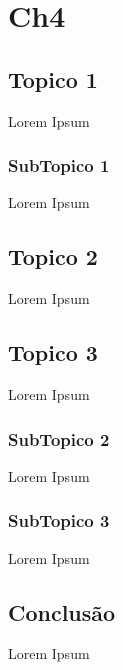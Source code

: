 \chapter{Ch4}
\label{chap:imp-test}

\section{Topico 1}
\label{chap4:sec:intro}

Lorem Ipsum

\subsection{SubTopico 1}

Lorem Ipsum

\section{Topico 2}
\label{chap4:sec:...}

Lorem Ipsum

\section{Topico 3}
\label{chap4:sec:concs}

Lorem Ipsum

\subsection{SubTopico 2}

Lorem Ipsum

\subsection{SubTopico 3}

Lorem Ipsum

\section{Conclusão}
\label{chap4:sec:concs}

Lorem Ipsum
